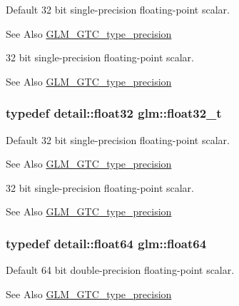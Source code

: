 Default 32 bit single-\/precision floating-\/point scalar. \begin{DoxySeeAlso}{See Also}
\hyperlink{group__gtc__type__precision}{G\-L\-M\-\_\-\-G\-T\-C\-\_\-type\-\_\-precision}
\end{DoxySeeAlso}
32 bit single-\/precision floating-\/point scalar. \begin{DoxySeeAlso}{See Also}
\hyperlink{group__gtc__type__precision}{G\-L\-M\-\_\-\-G\-T\-C\-\_\-type\-\_\-precision} 
\end{DoxySeeAlso}
\hypertarget{group__gtc__type__precision_ga642737ae3e7c434b366f2191e6944bf2}{
\subsubsection[{float32\-\_\-t}]{\setlength{\rightskip}{0pt plus 5cm}typedef detail\-::float32 {\bf glm\-::float32\-\_\-t}}}\label{group__gtc__type__precision_ga642737ae3e7c434b366f2191e6944bf2}
Default 32 bit single-\/precision floating-\/point scalar. \begin{DoxySeeAlso}{See Also}
\hyperlink{group__gtc__type__precision}{G\-L\-M\-\_\-\-G\-T\-C\-\_\-type\-\_\-precision}
\end{DoxySeeAlso}
32 bit single-\/precision floating-\/point scalar. \begin{DoxySeeAlso}{See Also}
\hyperlink{group__gtc__type__precision}{G\-L\-M\-\_\-\-G\-T\-C\-\_\-type\-\_\-precision} 
\end{DoxySeeAlso}
\hypertarget{group__gtc__type__precision_gab721f828b41f46b20cf4883b50733d3b}{
\subsubsection[{float64}]{\setlength{\rightskip}{0pt plus 5cm}typedef detail\-::float64 {\bf glm\-::float64}}}\label{group__gtc__type__precision_gab721f828b41f46b20cf4883b50733d3b}
Default 64 bit double-\/precision floating-\/point scalar. \begin{DoxySeeAlso}{See Also}
\hyperlink{group__gtc__type__precision}{G\-L\-M\-\_\-\-G\-T\-C\-\_\-type\-\_\-precision}
\end{DoxySeeAlso}
